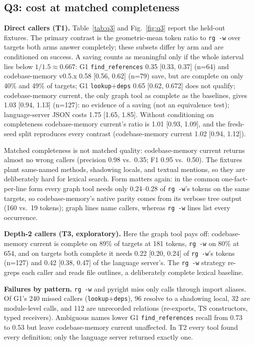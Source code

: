 \documentclass[conference]{IEEEtran}
\newcommand{\rg}{\texttt{rg\,-w}\xspace}
\newcommand{\cbm}{codebase-memory\xspace}
\begin{document}
\subsection{Q3: cost at matched completeness}
\textbf{Direct callers (T1).}
Table~\ref{tab:q3} and Fig.~\ref{fig:q3} report the held-out fixtures.
The primary contrast is the geometric-mean token ratio to \rg over targets both arms answer completely; these subsets differ by arm and are conditioned on success.
A saving counts as meaningful only if the whole interval lies below $1/1.5\approx0.667$:
G1 \texttt{find\_references} 0.35 [0.33, 0.37] (n=64) and \cbm v0.5.x 0.58 [0.56, 0.62] (n=79) save, but are complete on only 40\% and 49\% of targets;
G1 \texttt{lookup}+\texttt{deps} 0.65 [0.62, 0.672] does not qualify;
\cbm current, the only graph tool as complete as the baselines, gives 1.03 [0.94, 1.13] (n=127): no evidence of a saving (not an equivalence test);
language-server JSON costs 1.75 [1.65, 1.85].
Without conditioning on completeness \cbm current's ratio is 1.01 [0.93, 1.09], and the fresh-seed split reproduces every contrast (\cbm current 1.02 [0.94, 1.12]).

Matched completeness is not matched quality: \cbm current returns almost no wrong callers (precision 0.98 vs.\ 0.35; F1 0.95 vs.\ 0.50).
The fixtures plant same-named methods, shadowing locals, and textual mentions, so they are deliberately hard for lexical search.
Form matters again: in the common one-fact-per-line form every graph tool needs only 0.24--0.28 of \rg's tokens on the same targets, so \cbm's native parity comes from its verbose tree output (160 vs.\ 19 tokens); graph lines name callers, whereas \rg lines list every occurrence.

\textbf{Depth-2 callers (T3, exploratory).}
Here the graph tool pays off: \cbm current is complete on 89\% of targets at 181 tokens, \rg on 80\% at 654, and on targets both complete it needs 0.22 [0.20, 0.24] of \rg's tokens (n=127) and 0.42 [0.38, 0.47] of the language server's.
The \rg strategy re-greps each caller and reads file outlines, a deliberately complete lexical baseline.

\textbf{Failures by pattern.}
\rg and pyright miss only calls through import aliases.
Of G1's 240 missed callers (\texttt{lookup}+\texttt{deps}), 96 resolve to a shadowing local, 32 are module-level calls, and 112 are unrecorded relations (re-exports, TS constructors, typed receivers).
Ambiguous names lower G1 \texttt{find\_references} recall from 0.73 to 0.53 but leave \cbm current unaffected.
In T2 every tool found every definition; only the language server returned exactly one.
\end{document}
